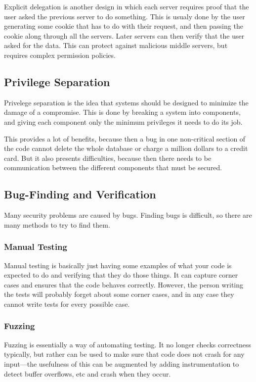 \documentclass{article}
\begin{document}
\begin{multicols*}{2}
Explicit delegation is another design in which each server requires proof that the user asked the previous server to do something. This is usualy done by the user generating some cookie that has to do with their request, and then passing the cookie along through all the servers. Later servers can then verify that the user asked for the data. This can protect against malicious middle servers, but requires complex permission policies. 

\subsection{Privilege Separation}
Privelege separation is the idea that systems should be designed to minimize the damage of a compromise. This is done by breaking a system into components, and giving each component only the minimum privileges it needs to do its job. 

This provides a lot of benefits, because then a bug in one non-critical section of the code cannot delete the whole database or charge a million dollars to a credit card. But it also presents difficulties, because then there needs to be communication between the different components that must be secured. 

\subsection{Bug-Finding and Verification}
Many security problems are caused by bugs. Finding bugs is difficult, so there are many methods to try to find them. 

\subsubsection{Manual Testing}
Manual testing is basically just having some examples of what your code is expected to do and verifying that they do those things. It can capture corner cases and ensures that the code behaves correctly. However, the person writing the tests will probably forget about some corner cases, and in any case they cannot write tests for every possible case.

\subsubsection{Fuzzing}
Fuzzing is essentially a way of automating testing. It no longer checks correctness typically, but rather can be used to make sure that code does not crash for any input---the usefulness of this can be augmented by adding instrumentation to detect buffer overflows, etc and crash when they occur. 


\end{multicols*}
\end{document}
